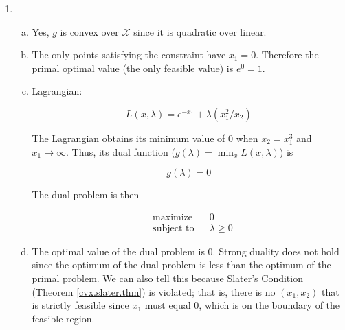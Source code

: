 \begin{enumerate}[(1)]
\begin{enumerate}[(a)]
\end{enumerate}


\item

\begin{enumerate}[(a)]

\item Yes, \(g\) is convex over \(\mathcal{X}\) since it is quadratic over linear.

\item  The only points satisfying the constraint have \(x_1 = 0\). Therefore the primal optimal value (the only feasible value) is \(e^0 = \boxed{1}\). 

\item Lagrangian:

\[
L(x, \lambda) = e^{-x_1} + \lambda (x_1^2/x_2)
\]

The Lagrangian obtains its minimum value of 0 when \(x_2 = x_1^3\) and \(x_1 \to \infty\). Thus, its dual function (\( g(\lambda) = \min_x L(x, \lambda)\)) is


\[
g(\lambda) = 0
\]
%
%

The dual problem is then

\[
\boxed{
\begin{aligned}
& {\text{maximize}}
& & 0 \\
& \text{subject to}
& & \lambda \geq 0
\end{aligned}}
\]

\item  The optimal value of the dual problem is 0. Strong duality does not hold since the optimum of the dual problem is less than the optimum of the primal problem. We can also tell this because Slater's Condition (Theorem \ref{cvx.slater.thm}) is violated; that is, there is no \((x_1, x_2)\) that is strictly feasible since \(x_1\) must equal 0, which is on the boundary of the feasible region. 


\end{enumerate}
\end{enumerate}
